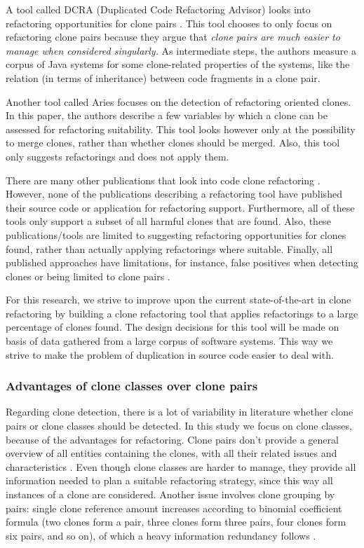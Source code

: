 \documentclass[a4paper]{article}
\begin{document}
A tool called DCRA (Duplicated Code Refactoring Advisor) looks into refactoring opportunities for clone pairs \cite{fontana2012duplicated}. This tool chooses to only focus on refactoring clone pairs because they argue that \textit{clone pairs are much easier to manage when considered singularly.} As intermediate steps, the authors measure a corpus of Java systems for some clone-related properties of the systems, like the relation (in terms of inheritance) between code fragments in a clone pair.
 
Another tool called Aries \cite{higo2004aries, higo2008metric} focuses on the detection of refactoring oriented clones. In this paper, the authors describe a few variables by which a clone can be assessed for refactoring suitability. This tool looks however only at the possibility to merge clones, rather than whether clones should be merged. Also, this tool only suggests refactorings and does not apply them.

There are many other publications that look into code clone refactoring \cite{alwaqfi2017refactoring, chen2018clone, koni2001scenario}. However, none of the publications describing a refactoring tool have published their source code or application for refactoring support. Furthermore, all of these tools only support a subset of all harmful clones that are found. Also, these publications/tools are limited to suggesting refactoring opportunities for clones found, rather than actually applying refactorings where suitable. Finally, all published approaches have limitations, for instance, false positives when detecting clones \cite{chen2018clone} or being limited to clone pairs \cite{higo2008metric}.

For this research, we strive to improve upon the current state-of-the-art in clone refactoring by building a clone refactoring tool that applies refactorings to a large percentage of clones found. The design decisions for this tool will be made on basis of data gathered from a large corpus of software systems. This way we strive to make the problem of duplication in source code easier to deal with.

\subsubsection{Advantages of clone classes over clone pairs}\label{chap:cloneclasses}
Regarding clone detection, there is a lot of variability in literature whether clone pairs or clone classes should be detected. In this study we focus on clone classes, because of the advantages for refactoring. Clone pairs don’t provide a general overview of all entities containing the clones, with all their related issues and characteristics \cite{fontana2012duplicated}. Even though clone classes are harder to manage, they provide all information needed to plan a suitable refactoring strategy, since this way all instances of a clone are considered. Another issue involves clone grouping by pairs: single clone reference amount increases according to binomial coefficient formula (two clones form a pair, three clones form three pairs, four clones form six pairs, and so on), of which a heavy information redundancy follows \cite{fontana2012duplicated}.
\end{document}
